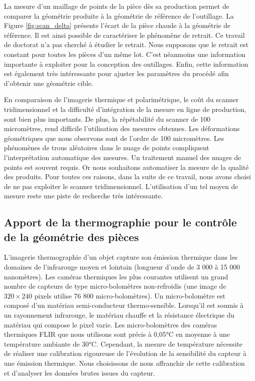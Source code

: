 La mesure d'un maillage de points de la pièce dès sa production permet de comparer la géométrie produite à la géométrie de référence de l'outillage.
La Figure \ref{fig:scan_delta} présente l'écart de la pièce chaude à la géométrie de référence.
Il est ainsi possible de caractériser le phénomène de retrait.
Ce travail de doctorat n'a pas cherché à étudier le retrait.
Nous supposons que le retrait est constant pour toutes les pièces d'un même lot.
C'est néanmoins une information importante à exploiter pour la conception des outillages.
Enfin, cette information est également très intéressante pour ajuster les paramètres du procédé afin d'obtenir une géométrie cible.

En comparaison de l'imagerie thermique et polarimétrique, le coût du scanner tridimensionnel et la difficulté d'intégration de la mesure en ligne de production, sont bien plus importants.
De plus, la répétabilité du scanner de 100 micromètres, rend difficile l'utilisation des mesures obtenues.
Les déformations géométriques que nous observons sont de l'ordre de 100 micromètres.
Les phénomènes de trous aléatoires dans le nuage de points compliquent l'interprétation automatique des mesures.
Un traitement manuel des nuages de points est souvent requis.
Or nous souhaitons automatiser la mesure de la qualité des produits.
Pour toutes ces raisons, dans la suite de ce travail, nous avons choisi de ne pas exploiter le scanner tridimensionnel.
L'utilisation d'un tel moyen de mesure reste une piste de recherche très intéressante.

\subsection{Apport de la thermographie pour le contrôle de la géométrie des pièces} \label{subsec:thermography}
L'imagerie thermographie d'un objet capture son émission thermique dans les domaines de l'infrarouge moyen et lointain (longueur d'onde de 3 000 à 15 000 nanomètres).
Les caméras thermiques les plus courantes utilisent un grand nombre de capteurs de type micro-bolomètres non-refroidis (une image de $320\times 240$ pixels utilise 76 800 micro-bolomètres).
Un micro-bolomètre est composé d'un matériau semi-conducteur thermo-sensible.
Lorsqu'il est soumis à un rayonnement infrarouge, le matériau chauffe et la résistance électrique du matériau qui compose le pixel varie.  %
Les micro-bolomètres des caméras thermiques FLIR que nous utilisons sont précis à 0,05°C en moyenne à une température ambiante de 30°C.
Cependant, la mesure de température nécessite de réaliser une calibration rigoureuse de l'évolution de la sensibilité du capteur à une émission thermique.
Nous choisissons de nous affranchir de cette calibration et d'analyser les données brutes issues du capteur.

